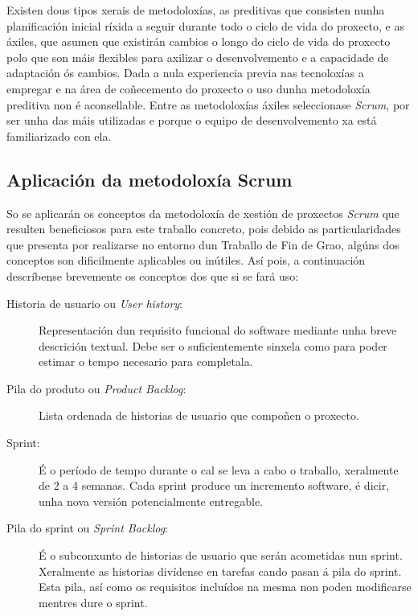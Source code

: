 Existen dous tipos xerais de metodoloxías, as preditivas que consisten nunha planificación inicial ríxida a seguir durante todo o ciclo de vida do proxecto, e as áxiles, que asumen que existirán cambios o longo do ciclo de vida do proxecto polo que son máis flexibles para axilizar o desenvolvemento e a capacidade de adaptación ós cambios. Dada a nula experiencia previa nas tecnoloxías a empregar e  na área de coñecemento do proxecto o uso dunha metodoloxía preditiva non é aconsellable. Entre as metodoloxías áxiles seleccionase \emph{Scrum}\cite{ScrumManager}, por ser unha das máis utilizadas e porque o equipo de desenvolvemento xa está familiarizado con ela.

\subsection{Aplicación da metodoloxía Scrum}

So se aplicarán os conceptos da metodoloxía de xestión de proxectos \emph{Scrum} que resulten beneficiosos para este traballo concreto, pois debido as particularidades que presenta por realizarse no entorno dun Traballo de Fin de Grao, algúns dos conceptos son dificilmente aplicables ou inútiles. Así pois, a continuación descríbense brevemente os conceptos dos que si se fará uso:
\begin{description}
\item[Historia de usuario ou \emph{User history}:] Representación dun requisito funcional do software mediante unha breve descrición textual. Debe ser o suficientemente sinxela como para poder estimar o tempo necesario para completala.
\item[Pila do produto ou \emph{Product Backlog}:] Lista ordenada de historias de usuario que compoñen o proxecto.
\item[Sprint:] É o período de tempo durante o cal se leva a cabo o traballo, xeralmente de 2 a 4 semanas. Cada sprint produce un incremento software, é dicir, unha nova versión potencialmente entregable.
\item[Pila do sprint ou \emph{Sprint Backlog}:] É o subconxunto de historias de usuario que serán acometidas nun sprint. Xeralmente as historias divídense en tarefas cando pasan á pila do sprint. Esta pila, así como os requisitos incluídos na mesma non poden modificarse mentres dure o sprint.
\end{description}

